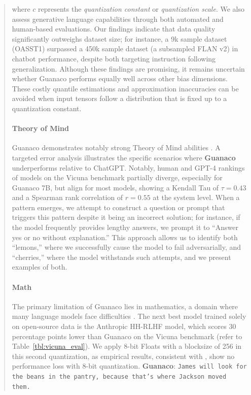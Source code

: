 \begin{quote}
where $c$ represents the {\em quantization constant} or {\em quantization scale}. We also assess generative language capabilities through both automated and human-based evaluations. Our findings indicate that data quality significantly outweighs dataset size; for instance, a 9k sample dataset (OASST1) surpassed a 450k sample dataset (a subsampled FLAN v2) in chatbot performance, despite both targeting instruction following generalization. Although these findings are promising, it remains uncertain whether {Guanaco} performs equally well across other bias dimensions. These costly quantile estimations and approximation inaccuracies can be avoided when input tensors follow a distribution that is fixed up to a quantization constant. \paragraph{Theory of Mind} {Guanaco} demonstrates notably strong Theory of Mind abilities \cite{nematzadeh2018evaluating, sap2022neural}. A targeted error analysis illustrates the specific scenarios where \textbf{Guanaco} underperforms relative to ChatGPT. Notably, human and GPT-4 rankings of models on the Vicuna benchmark partially diverge, especially for Guanaco 7B, but align for most models, showing a Kendall Tau of $\tau=0.43$ and a Spearman rank correlation of $r=0.55$ at the system level. When a pattern emerges, we attempt to construct a question or prompt that triggers this pattern despite it being an incorrect solution; for instance, if the model frequently provides lengthy answers, we prompt it to “Answer yes or no without explanation.” This approach allows us to identify both “lemons,” where we successfully cause the model to fail adversarially, and “cherries,” where the model withstands such attempts, and we present examples of both. \paragraph{Math} The primary limitation of {Guanaco} lies in mathematics, a domain where many language models face difficulties \citep{liang2022holistic}. The next best model trained solely on open-source data is the Anthropic HH-RLHF model, which scores 30 percentage points lower than {Guanaco} on the Vicuna benchmark (refer to Table~\ref{tbl:vicuna_eval}). We apply 8-bit Floats with a blocksize of 256 in this second quantization, as empirical results, consistent with \citet{dettmers2022case}, show no performance loss with 8-bit quantization. \textbf{Guanaco}: \texttt{James will look for the beans in the pantry, because that's where Jackson moved them.}
\end{quote}

